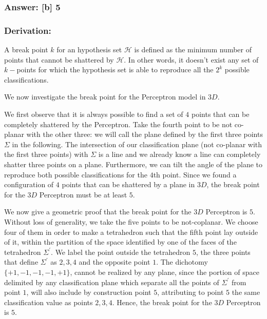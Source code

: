 \documentclass[11pt]{article}
\begin{document}
\hypertarget{answer-b-5}{%
\subsubsection{Answer: {[}b{]} 5}\label{answer-b-5}}

\hypertarget{derivation}{%
\subsubsection{Derivation:}\label{derivation}}

A break point \(k\) for an hypothesis set \(\mathcal{H}\) is defined as
the minimum number of points that cannot be shattered by
\(\mathcal{H}\). In other words, it doesn't exist any set of
\(k-\)points for which the hypothesis set is able to reproduce all the
\(2^k\) possible classifications.

We now investigate the break point for the Perceptron model in \(3D\).

We first observe that it is always possible to find a set of \(4\)
points that can be completely shattered by the Perceptron. Take the
fourth point to be not co-planar with the other three: we will call the
plane defined by the first three points \(\Sigma\) in the following. The
intersection of our classification plane (not co-planar with the first
three points) with \(\Sigma\) is a line and we already know a line can
completely shatter three points on a plane. Furthermore, we can tilt the
angle of the plane to reproduce both possible classifications for the
\(4\)th point. Since we found a configuration of \(4\) points that can
be shattered by a plane in \(3D\), the break point for the \(3D\)
Perceptron must be at least \(5\).

We now give a geometric proof that the break point for the \(3D\)
Perceptron is \(5\). Without loss of generality, we take the five points
to be not-coplanar. We choose four of them in order to make a
tetrahedron such that the fifth point lay outside of it, within the
partition of the space identified by one of the faces of the tetrahedron
\(\Sigma^\prime\). We label the point outside the tetrahedron \(5\), the
three points that define \(\Sigma^\prime\) as \(2,3,4\) and the opposite
point \(1\). The dichotomy \(\{+1,-1,-1,-1,+1\}\), cannot be realized by
any plane, since the portion of space delimited by any classification
plane which separate all the points of \(\Sigma^\prime\) from point
\(1\), will also include by construction point \(5\), attributing to
point \(5\) the same classification value as points \(2,3,4\). Hence,
the break point for the \(3D\) Perceptron is \(5\).
\end{document}
